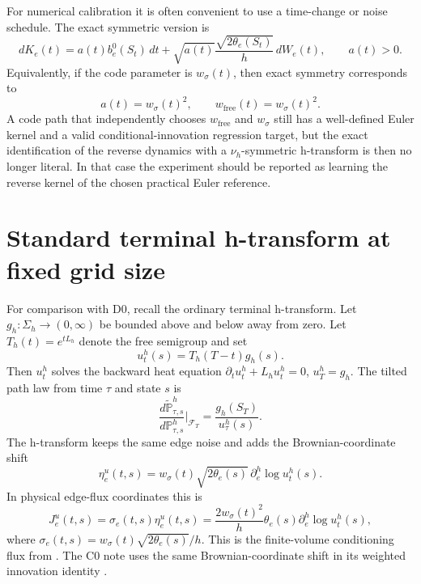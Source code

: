 \documentclass[11pt]{article}
\numberwithin{equation}{section}
\newcommand{\Pbb}{\mathbb P}
\newcommand{\SigmaH}{\Sigma_h}
\newcommand{\1}{\mathbf 1}
\begin{document}
For numerical calibration it is often convenient to use a time-change or noise schedule.  The exact symmetric version is
\begin{equation}\label{eq:symmetric-scaled-reference-d0}
  dK_e(t)=a(t)b_e^0(S_t)\,dt+\sqrt{a(t)}\frac{\sqrt{2\theta_e(S_t)}}{h}\,dW_e(t),
  \qquad a(t)>0.
\end{equation}
Equivalently, if the code parameter is \(w_\sigma(t)\), then exact symmetry corresponds to
\begin{equation}\label{eq:symmetry-scaling-condition-d0}
  a(t)=w_\sigma(t)^2,\qquad w_{\mathrm{free}}(t)=w_\sigma(t)^2.
\end{equation}
A code path that independently chooses \(w_{\mathrm{free}}\) and \(w_\sigma\) still has a well-defined Euler kernel and a valid conditional-innovation regression target, but the exact identification of the reverse dynamics with a \(\nu_h\)-symmetric h-transform is then no longer literal.  In that case the experiment should be reported as learning the reverse kernel of the chosen practical Euler reference.

\section{Standard terminal h-transform at fixed grid size}

For comparison with D0, recall the ordinary terminal h-transform.  Let \(g_h:\SigmaH\to(0,\infty)\) be bounded above and below away from zero.  Let \(T_h(t)=e^{tL_h}\) denote the free semigroup and set
\begin{equation}\label{eq:ordinary-h-potential-d0}
  u_t^h(s)=T_h(T-t)g_h(s).
\end{equation}
Then \(u_t^h\) solves the backward heat equation \(\partial_tu_t^h+L_hu_t^h=0\), \(u_T^h=g_h\).  The tilted path law from time \(\tau\) and state \(s\) is
\begin{equation}\label{eq:ordinary-tilted-law-d0}
  \frac{d\widetilde {\Pbb}^{h}_{\tau,s}}{d\Pbb^{h}_{\tau,s}}\Big|_{\mathcal F_T}
  =\frac{g_h(S_T)}{u^h_\tau(s)}.
\end{equation}
The h-transform keeps the same edge noise and adds the Brownian-coordinate shift
\begin{equation}\label{eq:brownian-shift-d0}
  \eta_e^u(t,s)=w_\sigma(t)\sqrt{2\theta_e(s)}\,\partial_e^h\log u_t^h(s).
\end{equation}
In physical edge-flux coordinates this is
\begin{equation}\label{eq:physical-conditioning-flux-d0}
  J_e^u(t,s)=\sigma_e(t,s)\eta_e^u(t,s)
  =\frac{2w_\sigma(t)^2}{h}\theta_e(s)\partial_e^h\log u_t^h(s),
\end{equation}
where \(\sigma_e(t,s)=w_\sigma(t)\sqrt{2\theta_e(s)}/h\).  This is the finite-volume conditioning flux from \cite[Sec.~7]{eulerian-manuscript}.  The C0 note uses the same Brownian-coordinate shift in its weighted innovation identity \cite[Secs.~6--8]{c0-note}.
\end{document}
